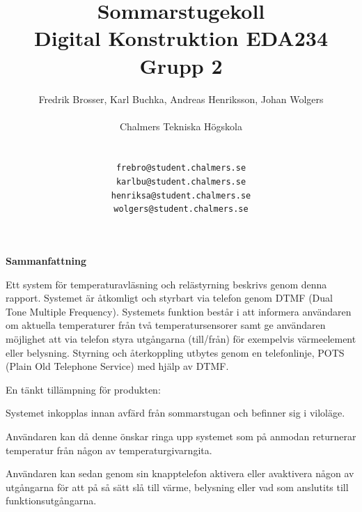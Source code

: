 \documentclass[a4paper,11pt]{article}
\begin{document}
\title{{\huge Sommarstugekoll} \\
	Digital Konstruktion EDA234 \\ Grupp 2}
\author{Fredrik Brosser, Karl Buchka, Andreas Henriksson, Johan Wolgers \\ \\
   	Chalmers Tekniska Högskola \\ \\
	\begin{tabular}{l c r}
		\texttt{frebro} & \texttt{@} & \texttt{student.chalmers.se}\\
		\texttt{karlbu} & \texttt{@} & \texttt{student.chalmers.se}\\
		\texttt{henriksa} & \texttt{@} & \texttt{student.chalmers.se}\\
		\texttt{wolgers} & \texttt{@} & \texttt{student.chalmers.se}\\\\
	\end{tabular}
	}
	
 \thispagestyle{empty}
\pagebreak

\maketitle
 \thispagestyle{empty}
\pagebreak
\newpage
\thispagestyle{empty}
\mbox{}
\pagebreak

 \thispagestyle{empty}
\begin{center}
	{\noindent \bf Sammanfattning}
\end{center}

	Ett system för temperaturavläsning och relästyrning beskrivs genom denna rapport. Systemet är åtkomligt och styrbart via telefon genom DTMF (Dual Tone Multiple Frequency). Systemets funktion består i att informera användaren om aktuella temperaturer från två temperatursensorer samt ge användaren möjlighet att via telefon styra utgångarna (till/från) för exempelvis värmeelement eller belysning. Styrning och återkoppling utbytes genom en telefonlinje, POTS (Plain Old Telephone Service) med hjälp av DTMF.

En tänkt tillämpning för produkten:
\begin{list}{*}{}
\item Systemet inkopplas innan avfärd från sommarstugan och befinner sig i viloläge. 
\item Användaren kan då denne önskar ringa upp systemet som på anmodan returnerar temperatur från någon av temperaturgivarngita.
\item Användaren kan sedan genom sin knapptelefon aktivera eller avaktivera någon av utgångarna för att på så sätt slå till värme, belysning eller vad som anslutits till funktionsutgångarna.
\end{list}
\end{document}
